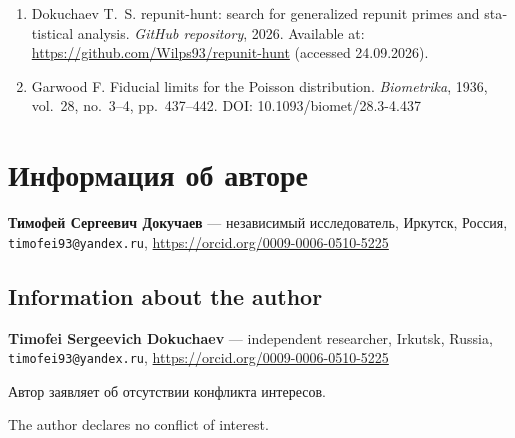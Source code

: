 \documentclass[11pt,a4paper]{article}
\theoremstyle{plain}
\theoremstyle{remark}
\begin{document}
\begin{otherlanguage}{english}
\begin{enumerate}
\item Dokuchaev T.~S. repunit-hunt: search for generalized repunit primes and
statistical analysis. \emph{GitHub repository}, 2026. Available at:
\url{https://github.com/Wilps93/repunit-hunt} (accessed 24.09.2026).

\item Garwood F. Fiducial limits for the Poisson distribution.
\emph{Biometrika}, 1936, vol.~28, no.~3--4, pp.~437--442.
DOI: 10.1093/biomet/28.3-4.437
\end{enumerate}
\end{otherlanguage}

\section*{Информация об авторе}
\noindent\textbf{Тимофей Сергеевич Докучаев} ---
независимый исследователь, Иркутск, Россия,\\
\texttt{timofei93@yandex.ru}, \url{https://orcid.org/0009-0006-0510-5225}

\begin{otherlanguage}{english}
\section*{Information about the author}
\noindent\textbf{Timofei Sergeevich Dokuchaev} ---
independent researcher, Irkutsk, Russia,\\
\texttt{timofei93@yandex.ru}, \url{https://orcid.org/0009-0006-0510-5225}
\end{otherlanguage}

\medskip
\noindent Автор заявляет об отсутствии конфликта интересов.

\begin{otherlanguage}{english}
\noindent The author declares no conflict of interest.
\end{otherlanguage}
\end{document}
